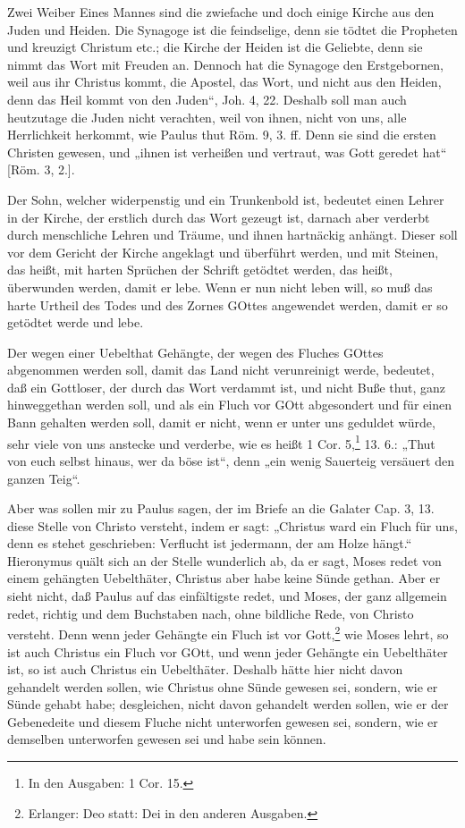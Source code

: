 Zwei Weiber Eines Mannes sind die zwiefache und doch einige Kirche aus den Juden und Heiden. Die Synagoge ist die feindselige, denn sie tödtet die Propheten und kreuzigt Christum etc.; die Kirche der Heiden ist die Geliebte, denn sie nimmt das Wort mit Freuden an. Dennoch hat die Synagoge den Erstgebornen, weil aus ihr Christus kommt, die Apostel, das Wort, und nicht aus den Heiden, denn das Heil kommt von den Juden“, Joh. 4, 22. Deshalb soll man auch heutzutage die Juden nicht verachten, weil von ihnen, nicht von uns, alle Herrlichkeit herkommt, wie Paulus thut Röm. 9, 3. ff. Denn sie sind die ersten Christen gewesen, und „ihnen ist verheißen und vertraut, was Gott geredet hat“ [Röm. 3, 2.].

Der Sohn, welcher widerpenstig und ein Trunkenbold ist, bedeutet einen Lehrer in der Kirche, der erstlich durch das Wort gezeugt ist, darnach aber verderbt durch menschliche Lehren und Träume, und ihnen hartnäckig anhängt. Dieser soll vor dem Gericht der Kirche angeklagt und überführt werden, und mit Steinen, das heißt, mit harten Sprüchen der Schrift getödtet werden, das heißt, überwunden werden, damit er lebe. Wenn er nun nicht leben will, so muß das harte Urtheil des Todes und des Zornes GOttes angewendet werden, damit er so getödtet werde und lebe.

Der wegen einer Uebelthat Gehängte, der wegen des Fluches GOttes abgenommen werden soll, damit das Land nicht verunreinigt werde, bedeutet, daß ein Gottloser, der durch das Wort verdammt ist, und nicht Buße thut, ganz hinweggethan werden soll, und als ein Fluch vor GOtt abgesondert und für einen Bann gehalten werden soll, damit er nicht, wenn er unter uns geduldet würde, sehr viele von uns anstecke und verderbe, wie es heißt 1 Cor. 5,\footnote{In den Ausgaben: 1 Cor. 15.} 13. 6.: „Thut von euch selbst hinaus, wer da böse ist“, denn „ein wenig Sauerteig versäuert den ganzen Teig“.

Aber was sollen mir zu Paulus sagen, der im Briefe an die Galater Cap. 3, 13. diese Stelle von Christo versteht, indem er sagt: „Christus ward ein Fluch für uns, denn es stehet geschrieben: Verflucht ist jedermann, der am Holze hängt.“ Hieronymus quält sich an der Stelle wunderlich ab, da er sagt, Moses redet von einem gehängten Uebelthäter, Christus aber habe keine Sünde gethan. Aber er sieht nicht, daß Paulus auf das einfältigste redet, und Moses, der ganz allgemein redet, richtig und dem Buchstaben nach, ohne bildliche Rede, von Christo versteht. Denn wenn jeder Gehängte ein Fluch ist vor Gott,\footnote{Erlanger: Deo statt: Dei in den anderen Ausgaben.} wie Moses lehrt, so ist auch Christus ein Fluch vor GOtt, und wenn jeder Gehängte ein Uebelthäter ist, so ist auch Christus ein Uebelthäter. Deshalb hätte hier nicht davon gehandelt werden sollen, wie Christus ohne Sünde gewesen sei, sondern, wie er Sünde gehabt habe; desgleichen, nicht davon gehandelt werden sollen, wie er der Gebenedeite und diesem Fluche nicht unterworfen gewesen sei, sondern, wie er demselben unterworfen gewesen sei und habe sein können.

